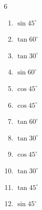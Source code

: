 \begin{multicols}{6}
\begin{enumerate}

  \item $\displaystyle \sin{45^\circ}$


  \item $\displaystyle \tan{60^\circ}$


  \item $\displaystyle \tan{30^\circ}$


  \item $\displaystyle \sin{60^\circ}$


  \item $\displaystyle \cos{45^\circ}$


  \item $\displaystyle \cos{45^\circ}$


\columnbreak %

  \item $\displaystyle \tan{60^\circ}$


  \item $\displaystyle \tan{30^\circ}$


  \item $\displaystyle \cos{45^\circ}$


  \item $\displaystyle \tan{30^\circ}$


  \item $\displaystyle \tan{45^\circ}$

        \phantom{$\displaystyle =1$}

  \item $\displaystyle \sin{45^\circ}$



\end{enumerate}
\end{multicols}
